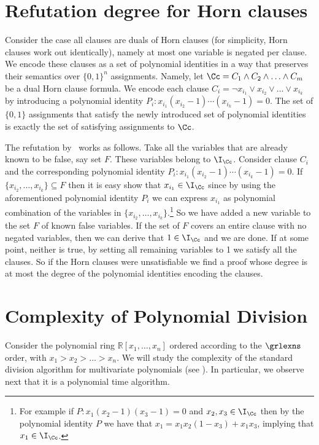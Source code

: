 \documentclass[11pt]{article}
\begin{document}
{
%

}

\newpage

\appendix
\section{Refutation degree for Horn clauses}\label{sect:ref_deg}
Consider the case all clauses are duals of Horn clauses (for simplicity, Horn clauses work out identically), namely at most one variable is negated per clause. 
We encode these clauses as a set of polynomial identities in a way that preserves their semantics over $\{0,1\}^n$ assignments.
Namely, let $\Cc=C_1\wedge C_2 \wedge \ldots \wedge C_m$ be a dual Horn clause formula. We encode each clause $C_i=\neg x_{i_1}\lor x_{i_2}\lor \ldots \lor x_{i_k}$ by introducing a polynomial identity $P_i:x_{i_1}(x_{i_2}-1)\cdots (x_{i_k}-1)=0$. The set of $\{0,1\}$ assignments that satisfy the newly introduced set of polynomial identities is exactly the set of satisfying assignments to $\Cc$.

The refutation by \PC\ works as follows. Take all the variables that are already known to be false, say set $F$. These variables belong to $\I_\Cc$. Consider clause $C_i$ and the corresponding polynomial identity $P_i:x_{i_1}(x_{i_2}-1)\cdots (x_{i_k}-1)=0$. If $\{x_{i_2},\ldots, x_{i_k}\}\subseteq F$ then it is easy show that $x_{i_1}\in \I_\Cc$ since by using the aforementioned polynomial identity $P_i$ we can express $x_{i_1}$ as polynomial combination of the variables in $\{x_{i_2},\ldots, x_{i_k}\}$.\footnote{For example if $P:x_{1}(x_{2}-1)(x_{3}-1)=0$ and $x_2,x_3\in\I_\Cc$ then by the polynomial identity $P$ we have that $x_1=x_{1}x_{2}(1-x_{3})+x_{1}x_{3}$, implying that $x_1\in\I_\Cc$.}
%
So we have added a new variable to the set $F$ of known false variables. If the set of $F$ covers an entire clause with no negated variables, then we can derive that $1\in \I_\Cc$ and we are done. If at some point, neither is true, by setting all remaining variables to 1 we satisfy all the clauses. So if the Horn clauses were unsatisfiable we find a proof whose degree is at most the degree of the polynomial identities encoding the clauses. 

\section{Complexity of Polynomial Division}\label{sect:PC_bit}
Consider the polynomial ring $\mathbb{R}[x_1, \dots, x_n]$ ordered according to the $\grlexns$ order, with $x_1 > x_2 > \dots > x_n$. We will study the complexity of the standard division algorithm for multivariate polynomials (see \cite[Section 2]{Cox}). In particular, we observe next that it is a polynomial time algorithm.
\end{document}
